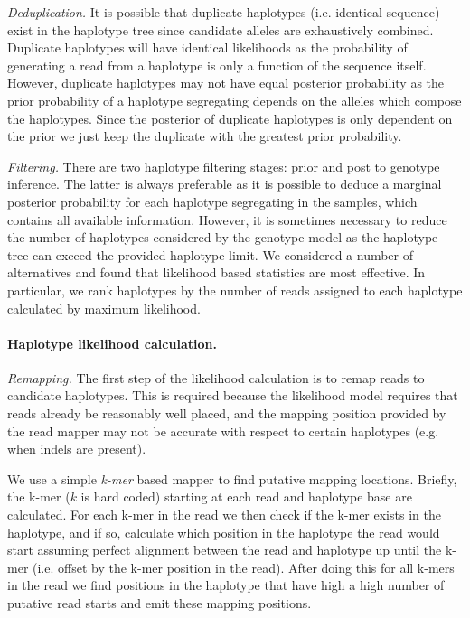 \documentclass[notitlepage, twocolumn, 10pt]{article}
\begin{document}
\vspace{3mm}
\noindent\emph{Deduplication.} It is possible that duplicate haplotypes (i.e. identical sequence) exist in the haplotype tree since candidate alleles are exhaustively combined. Duplicate haplotypes will have identical likelihoods as the probability of generating a read from a haplotype is only a function of the sequence itself. However, duplicate haplotypes may not have equal posterior probability as the prior probability of a haplotype segregating depends on the alleles which compose the haplotypes. Since the posterior of duplicate haplotypes is only dependent on the prior we just keep the duplicate with the greatest prior probability.

\vspace{3mm}
\noindent\emph{Filtering.} There are two haplotype filtering stages: prior and post to genotype inference. The latter is always preferable as it is possible to deduce a marginal posterior probability for each haplotype segregating in the samples, which contains all available information. However, it is sometimes necessary to reduce the number of haplotypes considered by the genotype model as the haplotype-tree can exceed the provided haplotype limit. We considered a number of alternatives and found that likelihood based statistics are most effective. In particular, we rank haplotypes by the number of reads assigned to each haplotype calculated by maximum likelihood.

\paragraph*{Haplotype likelihood calculation.} \emph{Remapping.} The first step of the likelihood calculation is to remap reads to candidate haplotypes. This is required because the likelihood model requires that reads already be reasonably well placed, and the mapping position provided by the read mapper may not be accurate with respect to certain haplotypes (e.g. when indels are present).

We use a simple \emph{k-mer} based mapper to find putative mapping locations. Briefly, the k-mer ($k$ is hard coded) starting at each read and haplotype base are calculated. For each k-mer in the read we then check if the k-mer exists in the haplotype, and if so, calculate which position in the haplotype the read would start assuming perfect alignment between the read and haplotype up until the k-mer (i.e. offset by the k-mer position in the read). After doing this for all k-mers in the read we find positions in the haplotype that have high a high number of putative read starts and emit these mapping positions.
\end{document}
